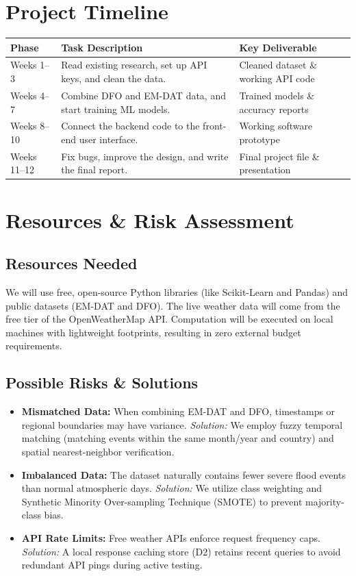 \documentclass[11pt,a4paper]{article}
\begin{document}
\section{Project Timeline}
\begin{table}[H]
\centering
\begin{tabular}{@{} l p{7.5cm} p{5cm} @{}}
\toprule
\textbf{Phase} & \textbf{Task Description} & \textbf{Key Deliverable} \\ \midrule
Weeks 1--3 & Read existing research, set up API keys, and clean the data. & Cleaned dataset \& working API code \\
Weeks 4--7 & Combine DFO and EM-DAT data, and start training ML models. & Trained models \& accuracy reports \\
Weeks 8--10 & Connect the backend code to the front-end user interface. & Working software prototype \\
Weeks 11--12 & Fix bugs, improve the design, and write the final report. & Final project file \& presentation \\ \bottomrule
\end{tabular}
\end{table}

\section{Resources \& Risk Assessment}
\subsection{Resources Needed}
We will use free, open-source Python libraries (like Scikit-Learn and Pandas) and public datasets (EM-DAT and DFO). The live weather data will come from the free tier of the OpenWeatherMap API. Computation will be executed on local machines with lightweight footprints, resulting in zero external budget requirements.

\subsection{Possible Risks \& Solutions}
\begin{itemize}
    \item \textbf{Mismatched Data:} When combining EM-DAT and DFO, timestamps or regional boundaries may have variance. \textit{Solution:} We employ fuzzy temporal matching (matching events within the same month/year and country) and spatial nearest-neighbor verification.
    \item \textbf{Imbalanced Data:} The dataset naturally contains fewer severe flood events than normal atmospheric days. \textit{Solution:} We utilize class weighting and Synthetic Minority Over-sampling Technique (SMOTE) to prevent majority-class bias.
    \item \textbf{API Rate Limits:} Free weather APIs enforce request frequency caps. \textit{Solution:} A local response caching store (D2) retains recent queries to avoid redundant API pings during active testing.
\end{itemize}
\end{document}
